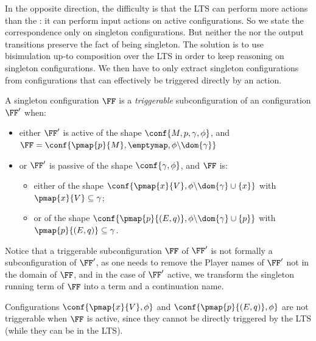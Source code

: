 \noindent
In the opposite direction, the
difficulty is that the \COGS LTS can perform more actions than the \AOGS:
it can perform input actions on active configurations.
So we state the correspondence only on singleton configurations.
But neither the \COGS nor the \AOGS output transitions preserve the fact of
being singleton.
The solution is to use bisimulation up-to composition over the \COGS LTS
in order to keep reasoning on singleton configurations.
We then have to only extract singleton configurations
from \AOGS configurations that can effectively be triggered directly by an action.

\begin{definition}
A singleton \COGS configuration $\FF$ is 
a \emph{triggerable} subconfiguration of an \AOGS configuration $\FF'$ when:
\begin{itemize}
  \item either $\FF'$ is active of the shape
  $\conf{M,p,\gamma,\phi}$,
  and $\FF = \conf{\pmap{p}{M},\emptymap,\phi \backslash{\dom{\gamma}}}$
  \item or $\FF'$ is passive of the shape
  $\conf{\gamma,\phi}$,
  and $\FF$ is:
  \begin{itemize}
    \item either of the shape
    $\conf{\pmap{x}{V},\phi \backslash{\dom{\gamma}} \cup\{x\}}$
    with $\pmap{x}{V} \subseteq \gamma$;
    \item or of the shape $\conf{\pmap{p}{(E,q)},\phi \backslash{\dom{\gamma}} \cup\{p\}}$
    with $\pmap{p}{(E,q)} \subseteq \gamma$.
  \end{itemize}
\end{itemize}
\end{definition}
\noindent
Notice that a triggerable subconfiguration $\FF$ of $\FF'$ is not formally a subconfiguration of $\FF'$,
as one needs to remove the Player names of $\FF'$ not in the domain of $\FF$, and in the case of $\FF'$ active,
we transform the singleton running term of $\FF$ into a term and a continuation name.

Configurations $\conf{\pmap{x}{V},\phi}$ and
$\conf{\pmap{p}{(E,q)},\phi}$ are not triggerable 
when $\FF$ is active,
since they cannot be directly triggered by the \AOGS LTS
(while they can be in the \COGS LTS).




